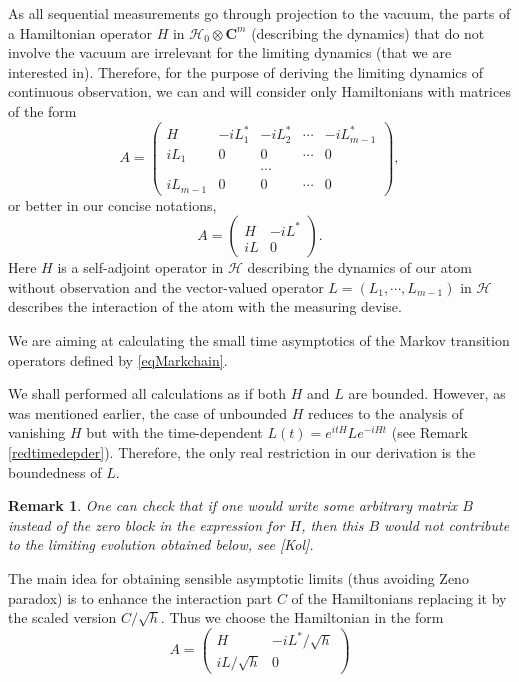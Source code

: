 \documentclass[12pt]{article}
\def\HC{\mathcal{H}}
\def\C{\mathbf{C}}
\newtheorem{remark}{Remark}
\begin{document}
As all sequential measurements go through projection to the vacuum, the parts of a Hamiltonian operator $H$
in $\HC_0\otimes \C^m$ (describing the dynamics) that do not involve the vacuum are irrelevant for the limiting
dynamics (that we are interested in). Therefore, for the purpose of deriving the limiting dynamics
of continuous observation, we can and will consider only  Hamiltonians
with matrices of the form
\[
A= \begin{pmatrix}
H & -iL_1^* & -iL_2^* &\cdots & -iL_{m-1}^*  \\
iL_1 & 0 & 0 & \cdots & 0 \\
&  &  \cdots &  & \\
iL_{m-1} & 0 & 0 & \cdots & 0
\end{pmatrix},
\]
or better in our concise notations,
\[
A= \begin{pmatrix}
H & -iL^*   \\
iL & 0
\end{pmatrix}.
\]
Here $H$ is a self-adjoint operator in $\HC$ describing
the dynamics of our atom without observation and the vector-valued operator $L=(L_1, \cdots , L_{m-1})$
in $\HC$ describes the interaction of the atom with the measuring devise.

We are aiming at calculating the small time asymptotics of the
Markov transition operators defined by \eqref{eqMarkchain}.

We shall performed all calculations as if both $H$ and $L$ are bounded. However, as was mentioned earlier,
the case of unbounded $H$ reduces to the analysis of vanishing $H$ but with the time-dependent
$L(t)=e^{itH}Le^{-iHt}$ (see Remark \ref{redtimedepder}). Therefore, the only real restriction
in our derivation is the boundedness of $L$.

\begin{remark}
One can check that if one would write some arbitrary matrix $B$ instead
of the zero block in the expression for $H$, then
this $B$ would not contribute to the limiting evolution obtained below, see [Kol].
\end{remark}

The main idea for obtaining sensible asymptotic limits (thus avoiding Zeno paradox)
is to enhance the interaction part $C$ of the Hamiltonians
 replacing it by the scaled version $C/\sqrt h$. Thus we choose the Hamiltonian in the form
\begin{equation}
\label{interham}
A= \begin{pmatrix}
H & -iL^*/\sqrt h   \\
iL/\sqrt h & 0
\end{pmatrix}
\end{equation}
\end{document}
